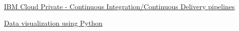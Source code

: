 \begin{coursework}


        {\href{https://www.credly.com/badges/16c6ed00-aecc-4e87-b155-27021d8bfbba}
        {\underline{IBM Cloud Private - Continuous Integration/Continuous Delivery pipelines}}}


        {\href{https://www.credly.com/badges/bc334b4f-7eda-4e0f-b61a-82eb36d5a733}
        {\underline{Data visualization using Python}}}

\end{coursework}
